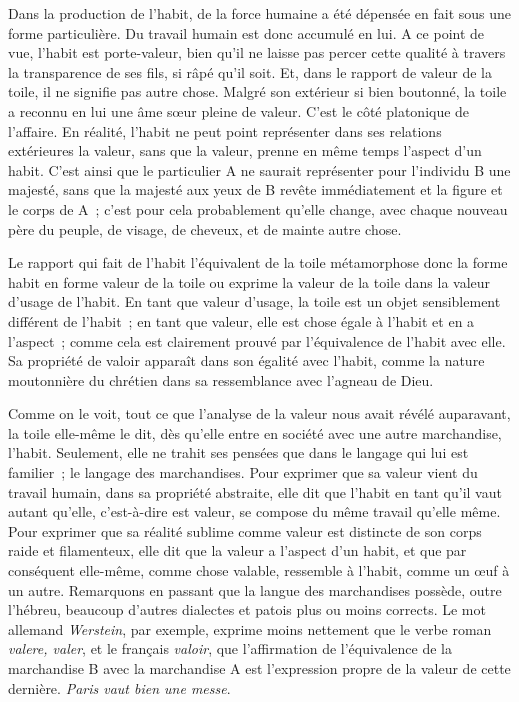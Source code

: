 \documentclass[french,twoside]{book} %
\begin{document}
Dans la production de l’habit, de la force humaine a été dépensée en fait sous une forme particulière. Du travail humain est donc accumulé en lui. A ce point de vue, l’habit est porte-valeur, bien qu’il ne laisse pas percer cette qualité à travers la transparence de ses fils, si râpé qu’il soit. Et, dans le rapport de valeur de la toile, il ne signifie pas autre chose. Malgré son extérieur si bien boutonné, la toile a reconnu en lui une âme sœur pleine de valeur. C’est le côté platonique de l’affaire. En réalité, l’habit ne peut point représenter dans ses relations extérieures la valeur, sans que la valeur, prenne en même temps l’aspect d’un habit. C’est ainsi que le particulier A ne saurait représenter pour l’individu B une majesté, sans que la majesté aux yeux de B revête immédiatement et la figure et le corps de A ; c’est pour cela probablement qu’elle change, avec chaque nouveau père du peuple, de visage, de cheveux, et de mainte autre chose.\par
Le rapport qui fait de l’habit l’équivalent de la toile métamorphose donc la forme habit en forme valeur de la toile ou exprime la valeur de la toile dans la valeur d’usage de l’habit. En tant que valeur d’usage, la toile est un objet sensiblement différent de l’habit ; en tant que valeur, elle est chose égale à l’habit et en a l’aspect ; comme cela est clairement prouvé par l’équivalence de l’habit avec elle. Sa propriété de valoir apparaît dans son égalité avec l’habit, comme la nature moutonnière du chrétien dans sa ressemblance avec l’agneau de Dieu.\par
Comme on le voit, tout ce que l’analyse de la valeur nous avait révélé auparavant, la toile elle-même le dit, dès qu’elle entre en société avec une autre marchandise, l’habit. Seulement, elle ne trahit ses pensées que dans le langage qui lui est familier ; le langage des marchandises. Pour exprimer que sa valeur vient du travail humain, dans sa propriété abstraite, elle dit que l’habit en tant qu’il vaut autant qu’elle, c’est-à-dire est valeur, se compose du même travail qu’elle même. Pour exprimer que sa réalité sublime comme valeur est distincte de son corps raide et filamenteux, elle dit que la valeur a l’aspect d’un habit, et que par conséquent elle-même, comme chose valable, ressemble à l’habit, comme un œuf à un autre. Remarquons en passant que la langue des marchandises possède, outre l’hébreu, beaucoup d’autres dialectes et patois plus ou moins corrects. Le mot allemand \emph{Werstein}, par exemple, exprime moins nettement que le verbe roman \emph{valere, valer}, et le français \emph{valoir}, que l’affirmation de l’équivalence de la marchandise B avec la marchandise A est l’expression propre de la valeur de cette dernière. \emph{Paris vaut bien une messe}.\par
\end{document}
